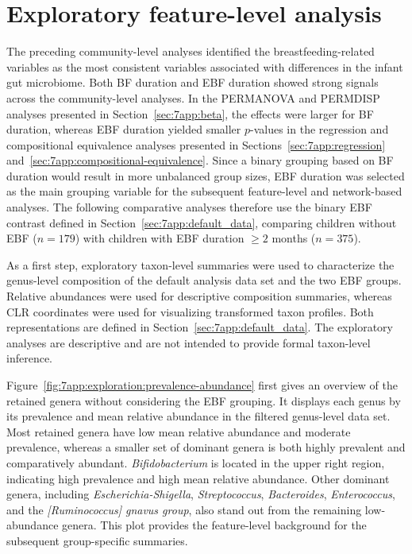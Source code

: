 \section{Exploratory feature-level analysis}
\label{sec:7app:feature-level-exploration}

The preceding community-level analyses identified the breastfeeding-related variables as the most consistent variables associated with differences in the infant gut microbiome. Both BF duration and EBF duration showed strong signals across the community-level analyses. In the PERMANOVA and PERMDISP analyses presented in Section~\ref{sec:7app:beta}, the effects were larger for BF duration, whereas EBF duration yielded smaller $p$-values in the regression and compositional equivalence analyses presented in Sections~\ref{sec:7app:regression} and~\ref{sec:7app:compositional-equivalence}. Since a binary grouping based on BF duration would result in more unbalanced group sizes, EBF duration was selected as the main grouping variable for the subsequent feature-level and network-based analyses. The following comparative analyses therefore use the binary EBF contrast defined in Section~\ref{sec:7app:default_data}, comparing children without EBF ($n=179$) with children with EBF duration $\ge 2$ months ($n=375$).

As a first step, exploratory taxon-level summaries were used to characterize the genus-level composition of the default analysis data set and the two EBF groups. Relative abundances were used for descriptive composition summaries, whereas CLR coordinates were used for visualizing transformed taxon profiles. Both representations are defined in Section~\ref{sec:7app:default_data}. The exploratory analyses are descriptive and are not intended to provide formal taxon-level inference.

Figure~\ref{fig:7app:exploration:prevalence-abundance} first gives an overview of the retained genera without considering the EBF grouping. It displays each genus by its prevalence and mean relative abundance in the filtered genus-level data set. Most retained genera have low mean relative abundance and moderate prevalence, whereas a smaller set of dominant genera is both highly prevalent and comparatively abundant. \emph{Bifidobacterium} is located in the upper right region, indicating high prevalence and high mean relative abundance. Other dominant genera, including \emph{Escherichia-Shigella}, \emph{Streptococcus}, \emph{Bacteroides}, \emph{Enterococcus}, and the \emph{[Ruminococcus] gnavus group}, also stand out from the remaining low-abundance genera. This plot provides the feature-level background for the subsequent group-specific summaries.


